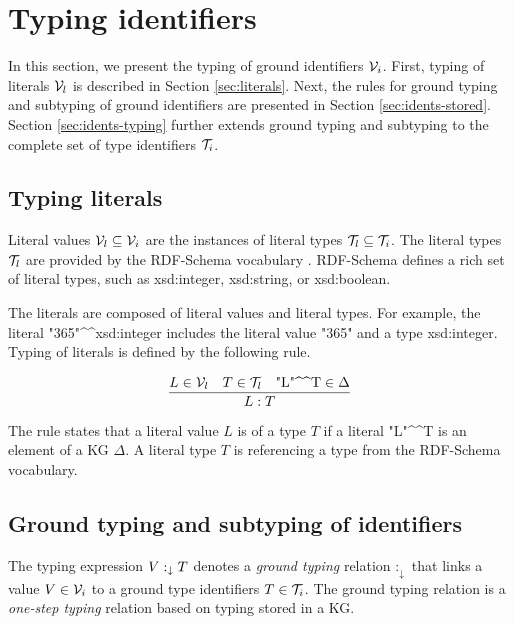 \documentclass[runningheads]{llncs}
\newcommand{\darr}{\downarrow}
\newcommand{\V}{{\cal V}}
\newcommand{\T}{{\cal T}}
\begin{document}
\section{Typing identifiers\label{sec:typ-idents}}

In this section, we present the typing of ground identifiers
$\V_i$. First, typing of literals $\V_l$ is described in Section
\ref{sec:literals}. Next, the rules for ground typing and subtyping of
ground identifiers are presented in Section
\ref{sec:idents-stored}. Section \ref{sec:idents-typing} further
extends ground typing and subtyping to the complete set of type
identifiers $\T_i$.





\subsection{Typing literals\label{sec:literals}}

Literal values $\V_l\subseteq\V_i$ are the instances of literal types
$\T_l\subseteq\T_i$. The literal types $\T_l$ are provided by the
RDF-Schema vocabulary \cite{rdfschema}. RDF-Schema defines a rich set
of literal types, such as xsd:integer, xsd:string, or xsd:boolean.

The literals are composed of literal values and literal types. For
example, the literal
"365"\textasciicircum\textasciicircum\/xsd:integer includes the
literal value "365" and a type xsd:integer. Typing of literals is
defined by the following rule.

\begin{equation}
\dfrac{L\in\V_l\quad T\in\T_l\quad \text{"L"\textasciicircum\textasciicircum\/T}\in\Delta}
      {L:T}  
\end{equation}

The rule states that a literal value $L$ is of a type $T$ if a literal
"L"\textasciicircum\textasciicircum\/T is an element of a KG
$\Delta$. A literal type $T$ is referencing a type from the RDF-Schema
vocabulary.






\subsection{Ground typing and subtyping of identifiers\label{sec:idents-stored}}

The typing expression $V:_\darr\/T$ denotes a \emph{ground typing}
relation $:_\darr$ that links a value $V\in\V_i$ to a ground type
identifiers $T\in\T_i$. The ground typing relation is a \emph{one-step
  typing} relation based on typing stored in a KG.
\end{document}
